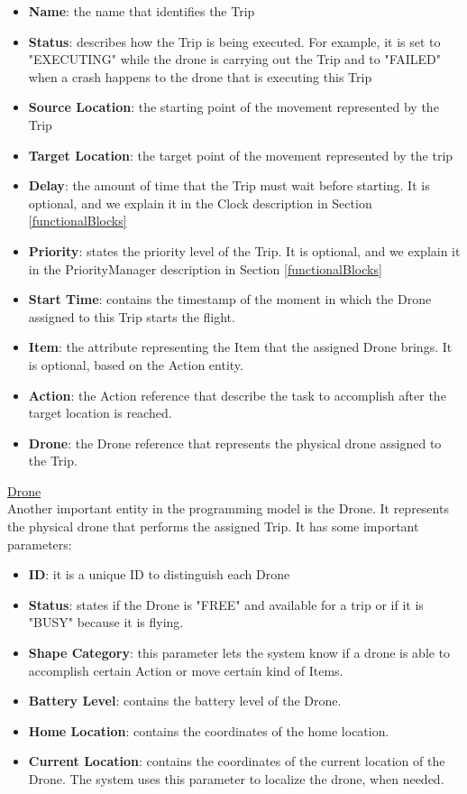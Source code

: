 \begin{itemize}
\item{\textbf{Name}: the name that identifies the Trip}
\item{\textbf{Status}: describes how the Trip is being executed. For example, it is set to "EXECUTING" while the drone is carrying out the Trip and to "FAILED" when a crash happens to the drone that is executing this Trip}
\item{\textbf{Source Location}: the starting point of the movement represented by the Trip}
\item{\textbf{Target Location}: the target point of the movement represented by the trip}
\item{\textbf{Delay}: the amount of time that the Trip must wait before starting.  It is optional, and we explain it in the Clock description in Section \ref{functionalBlocks}}
\item{\textbf{Priority}: states the priority level of the Trip.  It is optional, and we explain it in the PriorityManager description in Section \ref{functionalBlocks}}
\item{\textbf{Start Time}: contains the timestamp of the moment in which the Drone assigned to this Trip starts the flight.}
\item{\textbf{Item}: the attribute representing the Item that the assigned Drone brings. It is optional, based on the Action entity.}
\item{\textbf{Action}: the Action reference that describe the task to accomplish after the target location is reached.}
\item{\textbf{Drone}: the Drone reference that represents the physical drone assigned to the Trip.}
\end{itemize}

\underline{Drone}
\\

Another important entity in the programming model is the Drone. It represents the physical drone that performs the assigned Trip. It has some important parameters:

\begin{itemize}
\item{\textbf{ID}: it is a unique ID to distinguish each Drone}
\item{\textbf{Status}: states if the Drone is "FREE" and available for a trip or if it is "BUSY" because it is flying.}
\item{\textbf{Shape Category}: this parameter lets the system know if a drone is able to accomplish certain Action or move certain kind of Items.}
\item{\textbf{Battery Level}: contains the battery level of the Drone.}
\item{\textbf{Home Location}: contains the coordinates of the home location.}
\item{\textbf{Current Location}: contains the coordinates of the current location of the Drone. The system uses this parameter to localize the drone, when needed.}
\end{itemize}

